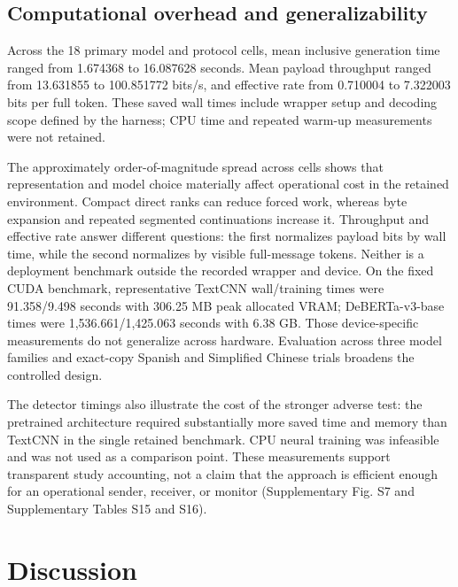 \documentclass[fleqn,10pt]{wlscirep}
\begin{document}
\subsection*{Computational overhead and generalizability}\label{sec:results-overhead}

Across the 18 primary model and protocol cells, mean inclusive generation time ranged from 1.674368 to 16.087628 seconds. Mean payload throughput ranged from 13.631855 to 100.851772 bits/s, and effective rate from 0.710004 to 7.322003 bits per full token. These saved wall times include wrapper setup and decoding scope defined by the harness; CPU time and repeated warm-up measurements were not retained.

The approximately order-of-magnitude spread across cells shows that representation and model choice materially affect operational cost in the retained environment. Compact direct ranks can reduce forced work, whereas byte expansion and repeated segmented continuations increase it. Throughput and effective rate answer different questions: the first normalizes payload bits by wall time, while the second normalizes by visible full-message tokens. Neither is a deployment benchmark outside the recorded wrapper and device.
On the fixed CUDA benchmark, representative TextCNN wall/training times were 91.358/9.498 seconds with 306.25 MB peak allocated VRAM; DeBERTa-v3-base times were 1,536.661/1,425.063 seconds with 6.38 GB. Those device-specific measurements do not generalize across hardware. Evaluation across three model families and exact-copy Spanish and Simplified Chinese trials broadens the controlled design.%

The detector timings also illustrate the cost of the stronger adverse test: the pretrained architecture required substantially more saved time and memory than TextCNN in the single retained benchmark. CPU neural training was infeasible and was not used as a comparison point. These measurements support transparent study accounting, not a claim that the approach is efficient enough for an operational sender, receiver, or monitor (Supplementary Fig. S7 and Supplementary Tables S15 and S16).




\section*{Discussion}\label{sec:discussion}
\end{document}
